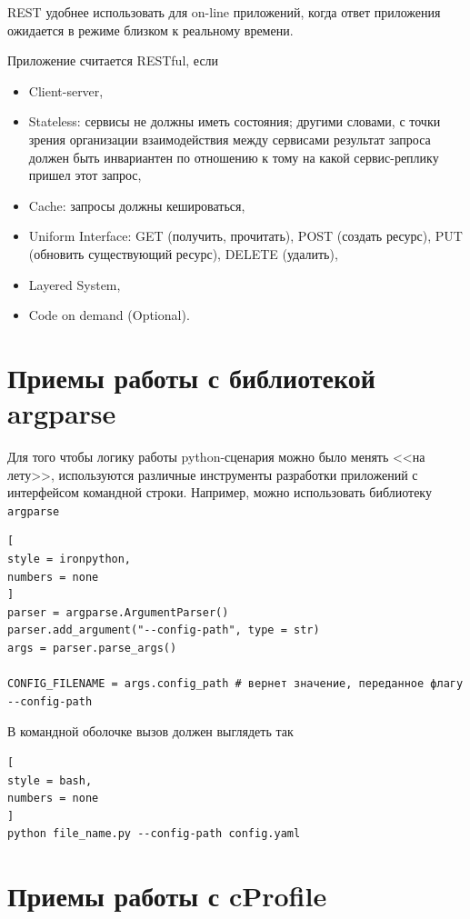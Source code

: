 \documentclass[%
	11pt,
	a4paper,
	utf8,
		]{article}
\begin{document}
REST удобнее использовать для on-line приложений, когда ответ приложения ожидается в режиме близком к реальному времени.

Приложение считается RESTful, если
\begin{itemize}
	\item Client-server,
	
	\item Stateless: сервисы не должны иметь состояния; другими словами, с точки зрения организации взаимодействия между сервисами результат запроса должен быть инвариантен по отношению к тому на какой сервис-реплику пришел этот запрос,
	
	\item Cache: запросы должны кешироваться,
	
	\item Uniform Interface: GET (получить, прочитать), POST (создать ресурс), PUT (обновить существующий ресурс), DELETE (удалить),
	
	\item Layered System,
	
	\item Code on demand (Optional).
\end{itemize}


\section{Приемы работы с библиотекой argparse}

Для того чтобы логику работы python-сценария можно было менять <<на лету>>, используются различные инструменты разработки приложений с интерфейсом командной строки. Например, можно использовать библиотеку \texttt{argparse} 
\begin{lstlisting}[
style = ironpython,
numbers = none	
]
parser = argparse.ArgumentParser()
parser.add_argument("--config-path", type = str)
args = parser.parse_args()

CONFIG_FILENAME = args.config_path # вернет значение, переданное флагу --config-path
\end{lstlisting}

В командной оболочке вызов должен выглядеть так
\begin{lstlisting}[
style = bash,
numbers = none
]
python file_name.py --config-path config.yaml
\end{lstlisting}


\section{Приемы работы с cProfile}
\end{document}
